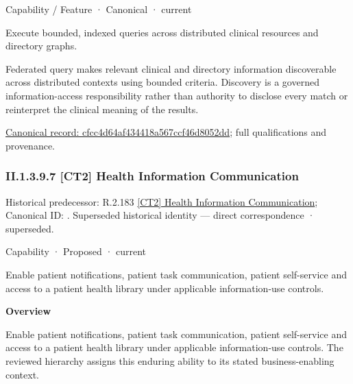 \label{element:cfcc4d64af434418a567ccf46d8052dd}
{\small Capability / Feature · Canonical · current}\par

Execute bounded, indexed queries across distributed clinical resources and directory graphs.



Federated query makes relevant clinical and directory information discoverable across distributed contexts using bounded criteria. Discovery is a governed information-access responsibility rather than authority to disclose every match or reinterpret the clinical meaning of the results.


{\footnotesize \href{../../../../continuum/strategy/capability/feature/cfcc4d64af434418a567ccf46d8052dd.md}{Canonical record: cfcc4d64af434418a567ccf46d8052dd}; full qualifications and provenance.}\par
\subsubsection*{II.1.3.9.7 [CT2] Health Information Communication}
\label{navigation:II.1.3.9.7}

{\small Historical predecessor: R.2.183 \hyperref[element:bcefb378424842fcb6d703208c3f8773]{[CT2] Health Information Communication}; Canonical ID: \texttt{}. Superseded historical identity — direct correspondence · superseded.}\par
\label{element:7925605bf60f4b288e826020409a09d9}
{\small Capability · Proposed · current}\par

Enable patient notifications, patient task communication, patient self-service and access to a patient health library under applicable information-use controls.



\textbf{Overview}



Enable patient notifications, patient task communication, patient self-service and access to a patient health library under applicable information-use controls. The reviewed hierarchy assigns this enduring ability to its stated business-enabling context.



